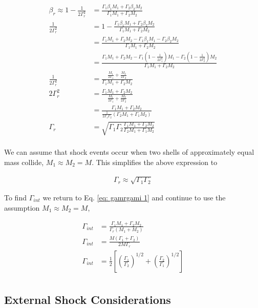 \documentclass[linenumbers,twocolumn]{aastex631}
\begin{document}
\begin{appendix}
\begin{align}
	\beta_r \approx 1-\frac{1}{2\Gamma_r^2} &= \frac{\Gamma_1\beta_1M_1+\Gamma_2\beta_2M_2}{\Gamma_1M_1 + \Gamma_2M_2} \\
	\frac{1}{2\Gamma_r^2} &= 1 - \frac{\Gamma_1\beta_1M_1+\Gamma_2\beta_2M_2}{\Gamma_1M_1 + \Gamma_2M_2} \\ 
	&= \frac{\Gamma_1M_1 + \Gamma_2M_2 - \Gamma_1\beta_1M_1 - \Gamma_2\beta_2M_2 }{\Gamma_1M_1 + \Gamma_2M_2} \\
	&= \frac{\Gamma_1M_1 + \Gamma_2M_2 - \Gamma_1(1-\frac{1}{2\Gamma_1^2})M_1 - \Gamma_2(1-\frac{1}{2\Gamma_2^2})M_2 }{\Gamma_1M_1 + \Gamma_2M_2} \\
	\frac{1}{2\Gamma_r^2} &= \frac{\frac{M_1}{2\Gamma_1} + \frac{M_2}{2\Gamma_2}}{\Gamma_1M_1 + \Gamma_2M_2} \\
	2\Gamma_r^2 &= \frac{\Gamma_1M_1 + \Gamma_2M_2}{\frac{M_1}{2\Gamma_1} + \frac{M_2}{2\Gamma_2}} \\
	&= \frac{\Gamma_1M_1 + \Gamma_2M_2}{\frac{1}{2\Gamma_1\Gamma_2}(\Gamma_2M_1 + \Gamma_1M_2)} \\
	\Gamma_r &= \sqrt{\Gamma_1\Gamma_2\frac{\Gamma_1M_1 + \Gamma_2M_2}{\Gamma_2M_1 + \Gamma_1M_2}} \\
\end{align}

We can assume that shock events occur when two shells of approximately equal mass collide, $M_1 \approx M_2 = M$. This simplifies the above expression to

\begin{align}
	\Gamma_r \approx \sqrt{\Gamma_1\Gamma_2}
\end{align}

To find $\Gamma_{int}$ we return to Eq. \ref{eq: gamrgami 1} and continue to use the assumption $M_1 \approx M_2 = M$, 

\begin{align}
	\Gamma_{int} &= \frac{\Gamma_1M_1 + \Gamma_2M_2}{\Gamma_r(M_1+M_2)}\\
	\Gamma_{int} &= \frac{M(\Gamma_1 + \Gamma_2)}{2M\Gamma_r}\\
	\Gamma_{int} &= \frac{1}{2}\left[ \left(\frac{\Gamma_1}{\Gamma_2}\right)^{1/2} + \left(\frac{\Gamma_2}{\Gamma_1}\right)^{1/2}\right]\\
\end{align}

\subsection{External Shock Considerations}


\end{appendix}
\end{document}
